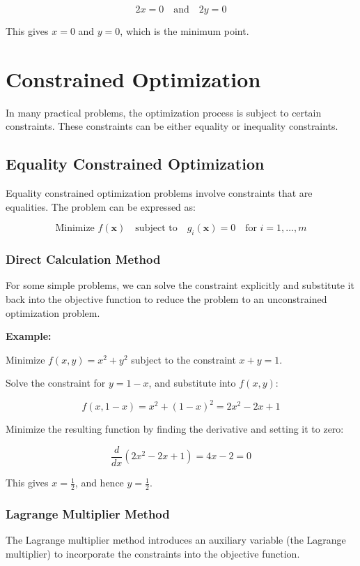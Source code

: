 \documentclass[]{article}
\begin{document}
	\[
	2x = 0 \quad \text{and} \quad 2y = 0
	\]
	
	This gives \( x = 0 \) and \( y = 0 \), which is the minimum point.
	
	\section{Constrained Optimization}
	In many practical problems, the optimization process is subject to certain constraints. These constraints can be either equality or inequality constraints.
	
	\subsection{Equality Constrained Optimization}
	Equality constrained optimization problems involve constraints that are equalities. The problem can be expressed as:
	
	\[
	\text{Minimize } f(\mathbf{x}) \quad \text{subject to} \quad g_i(\mathbf{x}) = 0 \quad \text{for } i = 1, \dots, m
	\]
	
	\subsubsection{Direct Calculation Method}
	For some simple problems, we can solve the constraint explicitly and substitute it back into the objective function to reduce the problem to an unconstrained optimization problem.
	
	\textbf{Example:}
	
	Minimize \( f(x, y) = x^2 + y^2 \) subject to the constraint \( x + y = 1 \).
	
	Solve the constraint for \( y = 1 - x \), and substitute into \( f(x, y) \):
	
	\[
	f(x, 1-x) = x^2 + (1-x)^2 = 2x^2 - 2x + 1
	\]
	
	Minimize the resulting function by finding the derivative and setting it to zero:
	
	\[
	\frac{d}{dx}(2x^2 - 2x + 1) = 4x - 2 = 0
	\]
	
	This gives \( x = \frac{1}{2} \), and hence \( y = \frac{1}{2} \).
	
	\subsubsection{Lagrange Multiplier Method}
	The Lagrange multiplier method introduces an auxiliary variable (the Lagrange multiplier) to incorporate the constraints into the objective function.
	
\end{document}
